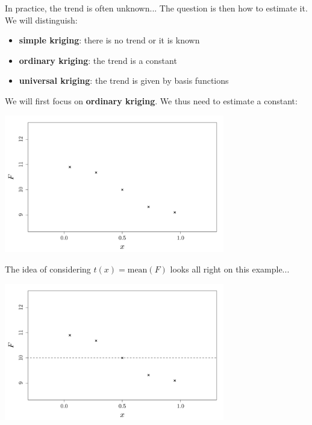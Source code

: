 \documentclass{beamer}
\begin{document}
\begin{frame}{}
In practice, the trend is often unknown... The question is then how to estimate it.\\ \vspace{5mm} 
We will distinguish:
\begin{itemize}
	\item \textbf{simple kriging}: there is no trend or it is known
	\item \textbf{ordinary kriging}: the trend is a constant
	\item \textbf{universal kriging}: the trend is given by basis functions
\end{itemize}
\end{frame}

\begin{frame}{}
We will first focus on \textbf{ordinary kriging}. We thus need to estimate a constant:\\ \vspace{5mm} 
\begin{center}
	\includegraphics[height=6cm]{figures/R/trend_dataordinary}
\end{center}
\end{frame}

\begin{frame}{}
The idea of considering $t(x)=\text{mean}(F)$ looks all right on this example...
\begin{center}
	\includegraphics[height=6cm]{figures/R/trend_basicordinary}
\end{center}
\end{frame}
\end{document}
